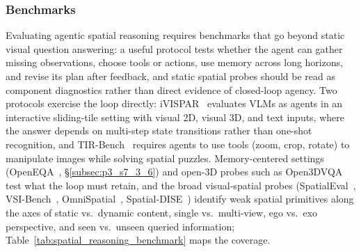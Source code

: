 \subsubsection{Benchmarks}
Evaluating agentic spatial reasoning requires benchmarks that go beyond static visual question answering: a useful protocol tests whether the agent can gather missing observations, choose tools or actions, use memory across long horizons, and revise its plan after feedback, and static spatial probes should be read as component diagnostics rather than direct evidence of closed-loop agency.
Two protocols exercise the loop directly: iVISPAR~\cite{mayer2025ivispar} evaluates VLMs as agents in an interactive sliding-tile setting with visual 2D, visual 3D, and text inputs, where the answer depends on multi-step state transitions rather than one-shot recognition, and TIR-Bench~\cite{li2025tirbench} requires agents to use tools (zoom, crop, rotate) to manipulate images while solving spatial puzzles.
Memory-centered settings (OpenEQA~\cite{majumdar2024openeqa}, §\ref{subsec:p3_s7_3_6}) and open-3D probes such as Open3DVQA~\cite{zhang2025open3dvqa} test what the loop must retain, and the broad visual-spatial probes (SpatialEval~\cite{wang2024picture}, VSI-Bench~\cite{yang2025vsibench}, OmniSpatial~\cite{jia2025omnispatial}, Spatial-DISE~\cite{huang2025spatialdise}) identify weak spatial primitives along the axes of static vs.\ dynamic content, single vs.\ multi-view, ego vs.\ exo perspective, and seen vs.\ unseen queried information; Table~\ref{tab:spatial_reasoning_benchmark} maps the coverage.

